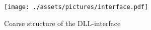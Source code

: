 \documentclass[]{scrreprt}
\begin{document}
\begin{figure}
    \texttt{[image: ./assets/pictures/interface.pdf]}
    \caption[]{Coarse structure of the DLL-interface}
    \label{fig:dllinterface}
\end{figure}












\end{document}

